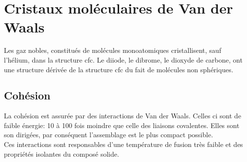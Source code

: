\section{Cristaux moléculaires de Van der Waals}
Les gaz nobles, constitués de molécules monoatomiques
cristallisent, sauf l’hélium, dans la structure cfc.
Le diiode, le dibrome, le dioxyde de carbone, ont
une structure dérivée de la structure cfc du
fait de molécules non sphériques.
\subsection{Cohésion}
La cohésion est assurée par des interactions de
Van der Waals. Celles ci sont de faible énergie:
10 à 100 fois moindre que celle des liaisons covalentes.
Elles sont son dirigées, par conséquent l'assemblage
est le plus compact possible.\\
Ces interactions sont responsables d'une température de
fusion très faible et des propriétés isolantes du composé
solide.
